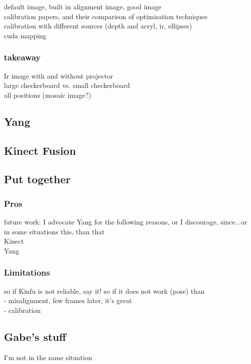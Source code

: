 default image, built in alignment image, good image\\
calibration papers, and their comparison of optimisation techniques\\
calibration with different sources (depth and acryl, ir, ellipses)\\
cuda mapping\\
\subsubsection{takeaway}
Ir image with and without projector\\
large checkerboard vs. small checkerboard\\
all positions (mosaic image?)\\

\subsection{Yang}
\subsection{Kinect Fusion}
\subsection{Put together}
\subsubsection{Pros}
future work: I advocate Yang for the following reasons, or I discourage, since...or in some situations this, than that \\
Kinect \\
Yang \\
\subsubsection{Limitations}
so if Kinfu is not reliable, say it! so if it does not work (pose) than \\
- misalignment, few frames later, it's great \\
    - calibration \\

\subsection{Gabe's stuff}

I'm not in the same situation

